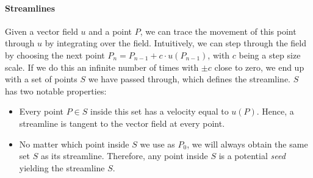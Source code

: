 \paragraph*{Streamlines}
Given a vector field $u$ and a point $P$, we can trace the movement of this point through $u$ by integrating over the field.
Intuitively, we can step through the field by choosing the next point $P_n = P_{n-1} + c \cdot u(P_{n-1})$, with $c$ being a step size scale.
If we do this an infinite number of times with $\pm c$ close to zero,
we end up with a set of points $S$ we have passed through, which defines the streamline.
$S$ has two notable properties:
\begin{itemize}
    \item Every point $P\in S$ inside this set has a velocity equal to $u(P)$.
    Hence, a streamline is tangent to the vector field at every point.
    \item No matter which point inside $S$ we use as $P_0$, we will always obtain the same set $S$ as its streamline.
    Therefore, any point inside $S$ is a potential \textit{seed} yielding the streamline $S$.
\end{itemize}
\newpage
